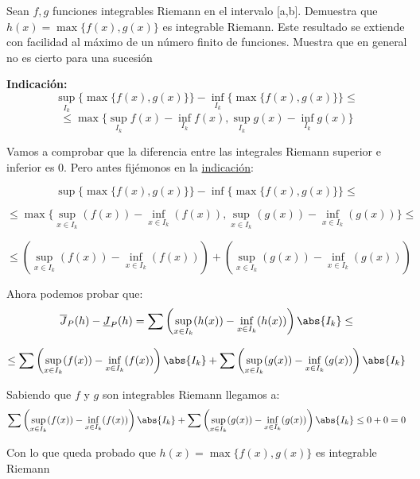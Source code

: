 \begin{problem}[2]
Sean $f,g$ funciones integrables Riemann en el intervalo [a,b]. Demuestra que $h(x)=\max\{f(x),g(x)\}$ es integrable Riemann. Este resultado se extiende con facilidad al máximo de un número finito de funciones. Muestra que en general no es cierto para una sucesión

\textbf{Indicación:}
\[\sup_{I_k}\{\max\{f(x),g(x)\}\}-\inf_{I_k}\{\max\{f(x),g(x)\}\} \leq \]
\[\leq \max\{\sup_{I_k}f(x)-\inf_{I_k}f(x), \sup_{I_k}g(x)-\inf_{I_k}g(x)\}\]

\solution
Vamos a comprobar que la diferencia entre las integrales Riemann superior e inferior es 0.
Pero antes fijémonos en la \underline{indicación}:

\[\sup\big\{ \max\{f(x), g(x)\}\big\} - \inf\big\{ \max\{f(x), g(x)\} \big\} \leq \]

\[ \leq \max\big\{ \sup_{x \in I_k} (f(x)) - \inf_{x \in I_k} (f(x)), \sup_{x \in I_k} (g(x)) - \inf_{x \in I_k} (g(x)) \big\} \leq \]

\[ \leq \left(\sup_{x \in I_k} (f(x)) - \inf_{x \in I_k} (f(x))\right) + \left(\sup_{x \in I_k} (g(x)) - \inf_{x \in I_k} (g(x))\right) \]


Ahora podemos probar que:
\[\overline{J}_P(h)-\underline{J}_P(h)
= \sum\left(\sup_{x\in I_k}(h(x))-\inf_{x\in I_k}(h(x))\right)\abs{I_k} \leq\]


\[\leq \sum\left( \sup_{x \in I_k} (f(x)) - \inf_{x \in I_k} (f(x)) \right) \abs{I_k} +
 \sum\left( \sup_{x \in I_k} (g(x)) - \inf_{x \in I_k} (g(x)) \right) \abs{I_k} \]

Sabiendo que $f$ y $g$ son integrables Riemann llegamos a:
\[\sum\left( \sup_{x \in I_k} (f(x)) - \inf_{x \in I_k} (f(x)) \right) \abs{I_k} +
 \sum\left( \sup_{x \in I_k} (g(x)) - \inf_{x \in I_k} (g(x)) \right) \abs{I_k} \leq 0 + 0 = 0\]

 Con lo que queda probado que $h(x) = \max\lbrace f(x), g(x) \rbrace$ es integrable Riemann

\end{problem}

